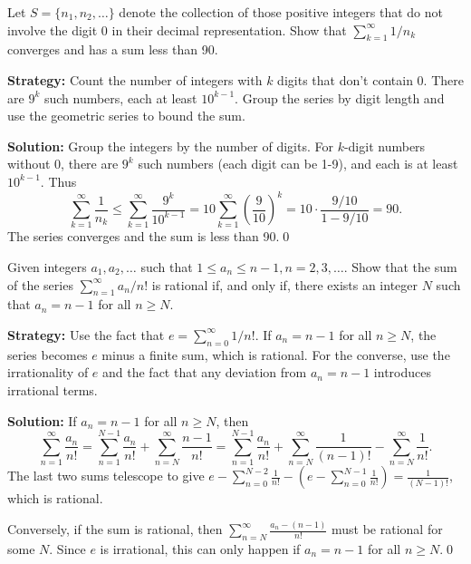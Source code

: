 \begin{problembox}
Let \(S = \{n_1, n_2, \ldots\}\) denote the collection of those positive integers that do not involve the digit 0 in their decimal representation. Show that \(\sum_{k=1}^{\infty} 1/n_k\) converges and has a sum less than 90.
\end{problembox}

\noindent\textbf{Strategy:} Count the number of integers with \(k\) digits that don't contain 0. There are \(9^k\) such numbers, each at least \(10^{k-1}\). Group the series by digit length and use the geometric series to bound the sum.

\bigskip\noindent\textbf{Solution:}
Group the integers by the number of digits. For \(k\)-digit numbers without 0, there are \(9^k\) such numbers (each digit can be 1-9), and each is at least \(10^{k-1}\). Thus
\[\sum_{k=1}^{\infty} \frac{1}{n_k} \leq \sum_{k=1}^{\infty} \frac{9^k}{10^{k-1}} = 10 \sum_{k=1}^{\infty} \left(\frac{9}{10}\right)^k = 10 \cdot \frac{9/10}{1-9/10} = 90.\]
The series converges and the sum is less than 90.\qed



\begin{problembox}
Given integers \(a_1, a_2, \ldots\) such that \(1 \leq a_n \leq n - 1, n = 2, 3, \ldots\). Show that the sum of the series \(\sum_{n=1}^{\infty} a_n / n!\) is rational if, and only if, there exists an integer \(N\) such that \(a_n = n - 1\) for all \(n \geq N\).
\end{problembox}

\noindent\textbf{Strategy:} Use the fact that \(e=\sum_{n=0}^{\infty} 1/n!\). If \(a_n=n-1\) for all \(n\ge N\), the series becomes \(e\) minus a finite sum, which is rational. For the converse, use the irrationality of \(e\) and the fact that any deviation from \(a_n=n-1\) introduces irrational terms.

\bigskip\noindent\textbf{Solution:}
If \(a_n = n-1\) for all \(n \geq N\), then
\[\sum_{n=1}^{\infty} \frac{a_n}{n!} = \sum_{n=1}^{N-1} \frac{a_n}{n!} + \sum_{n=N}^{\infty} \frac{n-1}{n!} = \sum_{n=1}^{N-1} \frac{a_n}{n!} + \sum_{n=N}^{\infty} \frac{1}{(n-1)!} - \sum_{n=N}^{\infty} \frac{1}{n!}.\]
The last two sums telescope to give \(e - \sum_{n=0}^{N-2} \frac{1}{n!} - (e - \sum_{n=0}^{N-1} \frac{1}{n!}) = \frac{1}{(N-1)!}\), which is rational.

Conversely, if the sum is rational, then \(\sum_{n=N}^{\infty} \frac{a_n - (n-1)}{n!}\) must be rational for some \(N\). Since \(e\) is irrational, this can only happen if \(a_n = n-1\) for all \(n \geq N\).\qed

